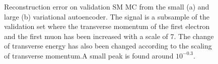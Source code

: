 \begin{figure}[H]
\begin{subfigure}{.45\textwidth}
        \caption{ }
        \label{fig:VAE_big_pt_7}
    \end{subfigure}
    \hfill 
    \caption[VAE | Reconstruction error $p_T$ altering of 7]{Reconstruction error on validation SM MC from the small (a) and large (b) variational autoencoder. The signal is a subsample of the validation 
    set where the transverse momentum of the first electron and the first muon has been increased with a scale of $7$. The change of transverse 
    energy has also been changed according to the scaling of transverse momentum.A small peak is found around $10^{-0.3}$. }
    \label{fig:VAE_big_small_pt_7}
\end{figure}
